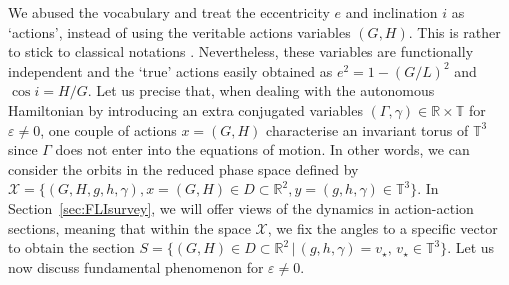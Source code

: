\documentclass{amsart}
\theoremstyle{definition}
\theoremstyle{remark}
\numberwithin{equation}{section}
\begin{document}
We abused the vocabulary and {\color{black}treat} the eccentricity $e$ and inclination $i$ as `actions', instead of {\color{black}using} the veritable actions variables $(G,H)$.
This is rather to stick to classical notations \citep{wKa66}. Nevertheless, these variables are functionally independent and {\color{black}the `true' actions} easily obtained as $e^{2}=1-(G/L)^{2}$ and $\cos i=H/G$. 
Let us precise that, when dealing with the autonomous Hamiltonian by introducing an {\color{black}extra} conjugated variables $(\Gamma,\gamma) \in \mathbb{R}\times\mathbb{T}$ for $\varepsilon \neq 0$, one couple of actions $x=(G,H)$ characterise an invariant torus of $\mathbb{T}^{3}$ since $\Gamma$ does not enter into the equations of motion. 
In other words, we can consider the orbits in the reduced phase space defined  by  $\mathcal{X}=\big\{ (G,H,g,h,\gamma), x=(G,H) \in D \subset \mathbb{R}^{2}, y=(g,h,\gamma) \in \mathbb{T}^{3}\big\}$. In Section~\ref{sec:FLIsurvey}, we will offer views of the dynamics in action-action sections, meaning that within the space $\mathcal{X}$, we fix the angles to a specific vector to obtain the section
$S=\big\{ (G,H) \in D \subset \mathbb{R}^{2} \, \vert \, (g,h,\gamma)= v_{\star},\, v_{\star} \in \mathbb{T}^{3}\big\}.$ Let us now discuss fundamental phenomenon for $\varepsilon \neq 0$.
 
\end{document}

